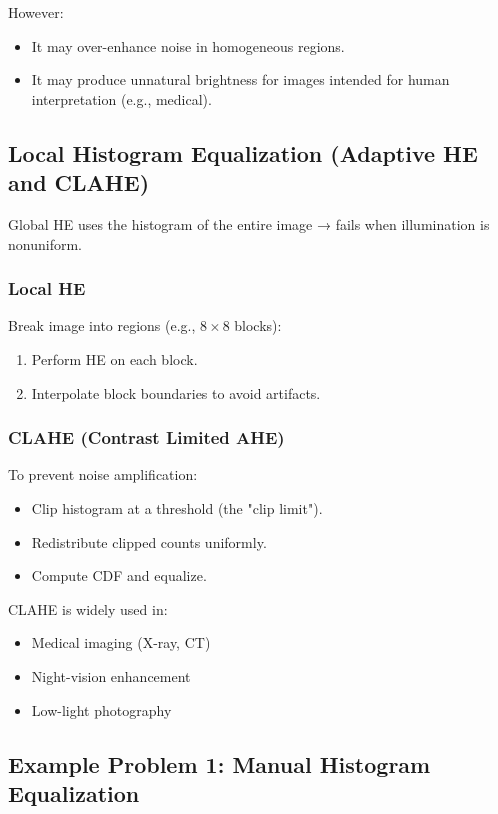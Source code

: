 \documentclass{AnantDocumentation}
\begin{document}
However:
\begin{itemize}
\item It may over-enhance noise in homogeneous regions.
\item It may produce unnatural brightness for images intended for human interpretation (e.g., medical).
\end{itemize}

\subsection{Local Histogram Equalization (Adaptive HE and CLAHE)}

Global HE uses the histogram of the entire image → fails when illumination is nonuniform.

\subsubsection{Local HE}
Break image into regions (e.g., \(8 \times 8\) blocks):
\begin{enumerate}
\item Perform HE on each block.
\item Interpolate block boundaries to avoid artifacts.
\end{enumerate}

\subsubsection{CLAHE (Contrast Limited AHE)}
To prevent noise amplification:
\begin{itemize}
\item Clip histogram at a threshold (the "clip limit").
\item Redistribute clipped counts uniformly.
\item Compute CDF and equalize.
\end{itemize}

CLAHE is widely used in:
\begin{itemize}
\item Medical imaging (X-ray, CT)
\item Night-vision enhancement
\item Low-light photography
\end{itemize}

\subsection{Example Problem 1: Manual Histogram Equalization}
\end{document}
